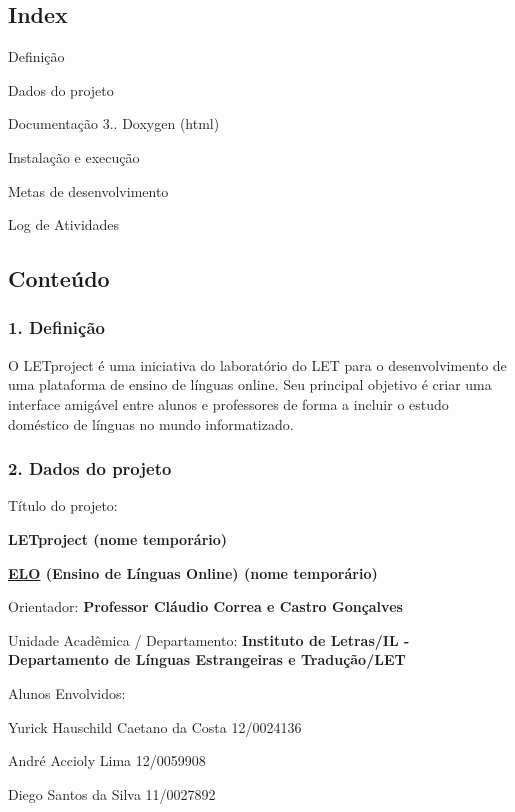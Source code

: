 \subsection*{Index}


\begin{DoxyEnumerate}
\item Definição
\item Dados do projeto
\item Documentação 3.. Doxygen (html)
\item Instalação e execução
\item Metas de desenvolvimento
\item Log de Atividades
\end{DoxyEnumerate}

\subsection*{Conteúdo}

\subsubsection*{1. Definição}

O L\-E\-Tproject é uma iniciativa do laboratório do L\-E\-T para o desenvolvimento de uma plataforma de ensino de línguas online. Seu principal objetivo é criar uma interface amigável entre alunos e professores de forma a incluir o estudo doméstico de línguas no mundo informatizado.

\subsubsection*{2. Dados do projeto}

Título do projeto\-:
\begin{DoxyItemize}
\item {\bfseries L\-E\-Tproject (nome temporário)}
\item {\bfseries \hyperlink{namespaceELO}{E\-L\-O} (Ensino de Línguas Online) (nome temporário)}
\end{DoxyItemize}

Orientador\-: {\bfseries Professor Cláudio Correa e Castro Gonçalves}

Unidade Acadêmica / Departamento\-: {\bfseries Instituto de Letras/\-I\-L -\/ Departamento de Línguas Estrangeiras e Tradução/\-L\-E\-T}

Alunos Envolvidos\-:
\begin{DoxyItemize}
\item Yurick Hauschild Caetano da Costa 12/0024136
\item André Accioly Lima 12/0059908
\item Diego Santos da Silva 11/0027892
\end{DoxyItemize}

